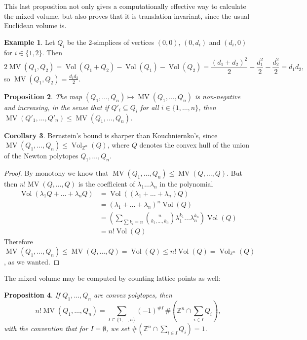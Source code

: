 \documentclass[11pt, a4paper]{article}
\newcommand{\ZZ}{\mathbb{Z}}
\DeclareMathOperator{\Vol}{Vol}
\DeclareMathOperator{\MV}{MV}
\theoremstyle{plain}
\newtheorem{prop}{Proposition}[section]
\theoremstyle{definition}
\newtheorem{exmp}[prop]{Example}
\newtheorem{coro}[prop]{Corollary}
\begin{document}
This last proposition not only gives a computationally effective way to calculate the mixed volume, but also proves that it is translation invariant, since the usual Euclidean volume is.

\begin{exmp} Let $Q_i$ be the 2-simplices of vertices $(0,0)$, $(0,d_i)$ and $(d_i,0)$ for $i\in\{1,2\}$. Then
\[2 \MV(Q_1,Q_2) = \Vol(Q_1+Q_2)-\Vol(Q_1)-\Vol(Q_2) = \frac{(d_1+d_2)^2}{2} -\frac{d_1^2}2-\frac{d_2^2}2=d_1d_2,\]
so $\MV(Q_1,Q_2)=\frac{d_1d_2}2$.
\end{exmp}

\begin{prop} The map $(Q_1,\dots,Q_n)\mapsto \MV(Q_1,\dots,Q_n)$ is non-negative and increasing, in the sense that if $Q'_i\subseteq Q_i$ for all $i\in\{1,\dots,n\}$, then $\MV(Q'_1,\dots,Q'_n)\leq\MV(Q_1,\dots,Q_n)$.
\end{prop}

\begin{coro} Bernstein's bound is sharper than Kouchniernko's, since $\MV(Q_1,\dots,Q_n)\leq \Vol_{\ZZ^n}(Q)$, where $Q$ denotes the convex hull of the union of the Newton polytopes $Q_1,\dots,Q_n$.
\end{coro}
\begin{proof} By monotony we know that $\MV(Q_1,\dots,Q_n)\leq \MV(Q,\dots,Q)$. But then $n! \MV(Q,\dots,Q)$ is the coefficient of $\lambda_1\dots\lambda_n$ in the polynomial
\begin{align*}
\Vol(\lambda_1Q+\dots+\lambda_nQ) &= \Vol((\lambda_1+\dots+\lambda_n)Q)\\
&=(\lambda_1+\dots+\lambda_n)^n\Vol(Q)\\
&=\left(\sum_{\sum k_i=n} \binom{n}{k_1,\dots, k_n}\lambda_1^{k_1}\dots\lambda_n^{k_n}\right) \Vol(Q)\\
&=n!\Vol(Q)
\end{align*}
Therefore $\MV(Q_1,\dots,Q_n)\leq \MV(Q,\dots,Q) = \Vol(Q) \leq n! \Vol(Q)=\Vol_{\ZZ^n}(Q)$, as we wanted.
\end{proof}

The mixed volume may be computed by counting lattice points as well:
\begin{prop} If $Q_1,\dots,Q_n$ are convex polytopes, then
\[n! \MV(Q_1,\dots,Q_n)=\sum_{I\subseteq\{1,\dots,n\}}(-1)^{\#I}\,\#\!\left(\ZZ^n\cap\sum_{i\in I}Q_i\right),\]
with the convention that for $I=\emptyset$, we set $\#\!\left(\ZZ^n\cap\sum_{i\in I}Q_i\right)=1$.
\end{prop}
\end{document}
